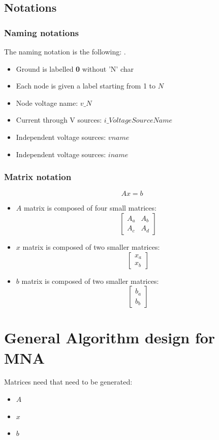 \documentclass[a4paper, titlepage]{article}
\begin{document}
    \subsection{Notations}
    \subsubsection{Naming notations}
    The naming notation is the following: \cite{nodeanalysis}.
    \begin{itemize}
        \item Ground is labelled \textbf{0} without 'N' char
        \item Each node is given a label starting from 1 to $N$ 
        \item Node voltage name: $v\_N$
        \item Current through V sources: $i\_VoltageSourceName$
        \item Independent voltage sources: $vname$
        \item Independent voltage sources: $iname$
    \end{itemize}
    \subsubsection{Matrix notation}
    $$Ax = b$$
    \begin{itemize}
        \item $A$ matrix is composed of four small matrices:
        $$
        \begin{bmatrix}
        A_{a}& A_{b}\\A_{c}&A_{d} 
        \end{bmatrix}
        $$
        \item $x$ matrix is composed of two smaller matrices:
        $$
        \begin{bmatrix}
        x_{a}\\x_{b}
        \end{bmatrix}
        $$
        \item $b$ matrix is composed of two smaller matrices:
        $$
        \begin{bmatrix}
        b_{a}\\b_{b} 
        \end{bmatrix}
        $$
    \end{itemize}

    

    \pagebreak
    \section{General Algorithm design for MNA}
    Matrices need that need to be generated:
    \begin{itemize}
        \item $A$ 
        \item $x$ 
        \item $b$
    \end{itemize}
\end{document}
